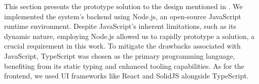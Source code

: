 This section presents the prototype solution to the design mentioned in
. We implemented the system's backend using Node.js, an
open-source JavaScript runtime environment. Despite JavaScript's inherent
limitations, such as its dynamic nature, employing Node.js allowed us to
rapidly prototype a solution, a crucial requirement in this work. To mitigate
the drawbacks associated with JavaScript, TypeScript was chosen as the primary
programming language, benefiting from its static typing and enhanced tooling
capabilities. As for the frontend, we used UI frameworks like React and SolidJS
alongside TypeScript.
